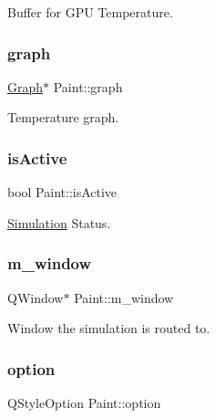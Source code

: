 Buffer for G\+PU Temperature. 

\mbox{\label{classPaint_a7c4451334289c681e3763ba244227b7a}} 
\subsubsection{\texorpdfstring{graph}{graph}}
{\footnotesize\ttfamily \mbox{\hyperlink{classGraph}{Graph}}$\ast$ Paint\+::graph\hspace{0.3cm}{\ttfamily [private]}}



Temperature graph. 

\mbox{\label{classPaint_ad3674af36118608e17d5f49812f0e398}} 
\subsubsection{\texorpdfstring{isActive}{isActive}}
{\footnotesize\ttfamily bool Paint\+::is\+Active\hspace{0.3cm}{\ttfamily [private]}}



\mbox{\hyperlink{classSimulation}{Simulation}} Status. 

\mbox{\label{classPaint_a12c0d1f2f57bd3aea9388f42aa6434f8}} 
\subsubsection{\texorpdfstring{m\_window}{m\_window}}
{\footnotesize\ttfamily Q\+Window$\ast$ Paint\+::m\+\_\+window\hspace{0.3cm}{\ttfamily [private]}}



Window the simulation is routed to. 

\mbox{\label{classPaint_ac0f5a8dc0d272705bd7251867e8eabf2}} 
\subsubsection{\texorpdfstring{option}{option}}
{\footnotesize\ttfamily Q\+Style\+Option Paint\+::option\hspace{0.3cm}{\ttfamily [private]}}



